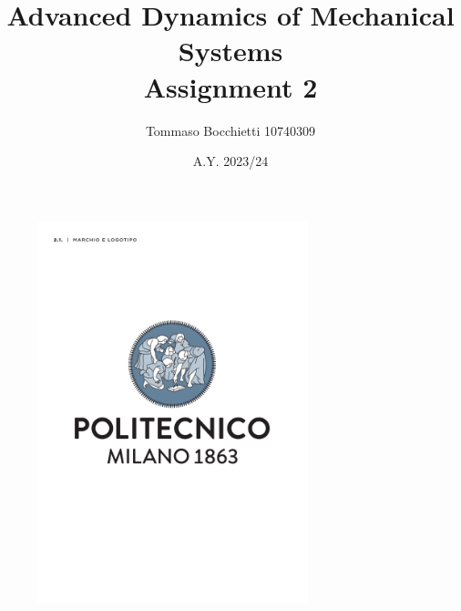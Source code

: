\documentclass{assignment}
\begin{document}
\title{Advanced Dynamics of Mechanical Systems \\ Assignment 2}
\author{Tommaso Bocchietti 10740309}
\date{A.Y. 2023/24}

\maketitle

\begin{figure}[H]
    \centering
    \includegraphics[width=0.7\textwidth]{./pdf/Polimi_logo_coverpage.pdf}
    \label{fig:Polimi_logo}
\end{figure}

\clearpage
\tableofcontents
\listoffigures
\listoftables
\lstlistoflistings

\clearpage





% 

% 
% 
\end{document}
